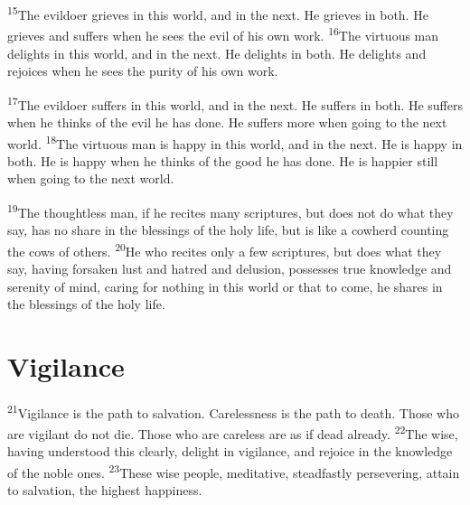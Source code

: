\documentclass[openany,12pt,english]{book}
\newenvironment{para}{\par\pretolerance=100\tolerance=200\setlength{\emergencystretch}{0.6em}\relax}{\par}
\begin{document}
\begin{para}
    \textsuperscript{15}\thinspace{}The evil\-do\-er grieves in this world, and in the next. He grieves in both. He grieves and suffers when he sees the evil of his own work.
    \textsuperscript{16}\thinspace{}The vir\-tu\-ous man delights in this world, and in the next. He delights in both. He delights and rejoices when he sees the pu\-ri\-ty of his own work.
\end{para}

\begin{para}
    \textsuperscript{17}\thinspace{}The evil\-do\-er suffers in this world, and in the next. He suffers in both. He suffers when he thinks of the evil he has done. He suffers more when go\-ing to the next world.
    \textsuperscript{18}\thinspace{}The vir\-tu\-ous man is hap\-py in this world, and in the next. He is hap\-py in both. He is hap\-py when he thinks of the good he has done. He is hap\-pi\-er still when go\-ing to the next world.
\end{para}

\begin{para}
    \textsuperscript{19}\thinspace{}The thought\-less man, if he recites man\-y scriptures, but does not do what they say, has no share in the blessings of the ho\-ly life, but is like a cow\-herd counting the cows of others.
    \textsuperscript{20}\thinspace{}He who recites on\-ly a few scriptures, but does what they say, hav\-ing for\-sak\-en lust and ha\-tred and de\-lu\-sion, possesses true knowl\-edge and se\-ren\-i\-ty of mind, car\-ing for noth\-ing in this world or that to come, he shares in the blessings of the ho\-ly life.
\end{para}

\begin{para}
\end{para}

\section*{Vigilance}
\begin{para}
    \textsuperscript{21}\thinspace{}Vig\-i\-lance is the path to sal\-va\-tion. Care\-less\-ness is the path to death. Those who are vig\-i\-lant do not die. Those who are care\-less are as if dead al\-read\-y.
    \textsuperscript{22}\thinspace{}The wise, hav\-ing un\-der\-stood this clear\-ly, de\-light in vig\-i\-lance, and re\-joice in the knowl\-edge of the no\-ble ones.
    \textsuperscript{23}\thinspace{}These wise peo\-ple, meditative, stead\-fast\-ly per\-se\-ver\-ing, at\-tain to sal\-va\-tion, the highest hap\-pi\-ness.
\end{para}
\end{document}
